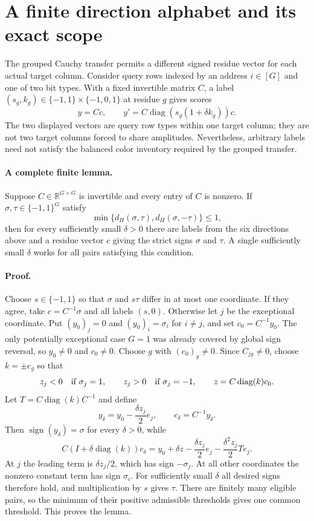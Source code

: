 \section{A finite direction alphabet and its exact scope}
\label{sec:finite-direction-alphabet}

The grouped Cauchy transfer permits a different signed residue vector for
 each actual target column.  Consider query rows indexed by an address
 $i\in[G]$ and one of two bit types.  With a fixed invertible matrix $C$, a
 label $(s_g,k_g)\in\{-1,1\}\times\{-1,0,1\}$ at residue $g$ gives scores
\[
 y=Cc,\qquad y'=C\operatorname{diag}(s_g(1+\delta k_g))c.
\]
The two displayed vectors are query row types within one target column;
 they are not two target columns forced to share amplitudes.  Nevertheless,
 arbitrary labels need not satisfy the balanced color inventory required
 by the grouped transfer.

\paragraph{A complete finite lemma.}
Suppose $C\in\mathbb R^{G\times G}$ is invertible and every entry of $C$
 is nonzero.  If $\sigma,\tau\in\{-1,1\}^G$ satisfy
\[
 \min\{d_H(\sigma,\tau),d_H(\sigma,-\tau)\}\leq 1,
\]
then for every sufficiently small $\delta>0$ there are labels from the six
 directions above and a residue vector $c$ giving the strict signs
 $\sigma$ and $\tau$.  A single sufficiently small $\delta$ works for all
 pairs satisfying this condition.

\paragraph{Proof.}
Choose $s\in\{-1,1\}$ so that $\sigma$ and $s\tau$ differ in at most one
 coordinate.  If they agree, take $c=C^{-1}\sigma$ and all labels $(s,0)$.
Otherwise let $j$ be the exceptional coordinate.  Put $(y_0)_j=0$ and
 $(y_0)_i=\sigma_i$ for $i\ne j$, and set $c_0=C^{-1}y_0$.  The only
 potentially exceptional case $G=1$ was already covered by global sign
 reversal, so $y_0\ne0$ and $c_0\ne0$.  Choose $g$ with $(c_0)_g\ne0$.
Since $C_{jg}\ne0$, choose $k=\pm e_g$ so that
\[
 z_j<0\quad\hbox{if }\sigma_j=1,\qquad
 z_j>0\quad\hbox{if }\sigma_j=-1,
 \qquad z=C\operatorname{diag}(k)c_0.
\]
Let $T=C\operatorname{diag}(k)C^{-1}$ and define
\[
 y_\delta=y_0-\frac{\delta z_j}{2}e_j,
 \qquad c_\delta=C^{-1}y_\delta.
\]
Then $\operatorname{sign}(y_\delta)=\sigma$ for every $\delta>0$, while
\[
 C(I+\delta\operatorname{diag}(k))c_\delta
 =y_0+\delta z-\frac{\delta z_j}{2}e_j
  -\frac{\delta^2z_j}{2}Te_j.
\]
At $j$ the leading term is $\delta z_j/2$, which has sign $-\sigma_j$.
At all other coordinates the nonzero constant term has sign $\sigma_i$.
For sufficiently small $\delta$ all desired signs therefore hold, and
 multiplication by $s$ gives $\tau$.  There are finitely many eligible
 pairs, so the minimum of their positive admissible thresholds gives one
 common threshold.  This proves the lemma.

